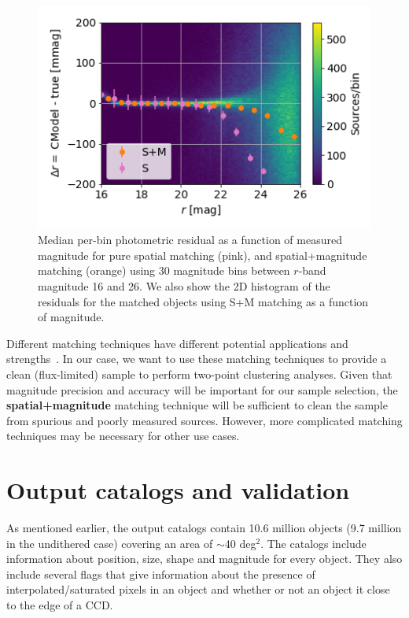 \documentclass[a4paper,fleqn,usenatbib]{mnras}
\begin{document}
\begin{figure}
\centering
\includegraphics[width=0.85\columnwidth]{photometry_residual_comparison}
\caption{Median per-bin photometric residual as a function of measured magnitude for pure spatial matching (pink), and spatial+magnitude matching (orange) using 30 magnitude bins between $r$-band magnitude 16 and 26. We also show the 2D histogram of the residuals for the matched objects using \textsf{S+M} matching as a function of magnitude.}
\label{fig:matching_comparison}
\end{figure}

Different matching techniques have different potential applications and strengths~\citep{doi:10.1146/annurev-statistics-010814-020231}. In our case, we want to use these matching techniques to provide a clean (flux-limited) sample to perform two-point clustering analyses. Given that magnitude precision and accuracy will be important for our sample selection, the \textbf{spatial+magnitude} matching technique will be sufficient to clean the sample from spurious and poorly measured sources. However, more complicated matching techniques may be necessary for other use cases.
 
 
\section{Output catalogs and validation}
\label{sec:catalogs}
As mentioned earlier, the output catalogs contain 10.6 million objects (9.7 million in the undithered case) covering an area
of $\sim$40 deg$^{2}$. The catalogs include information about position, size, shape and magnitude for every object. They also include several flags that give information about the presence of interpolated/saturated pixels in an object and whether or not an object it close to the edge of a CCD.
\end{document}
